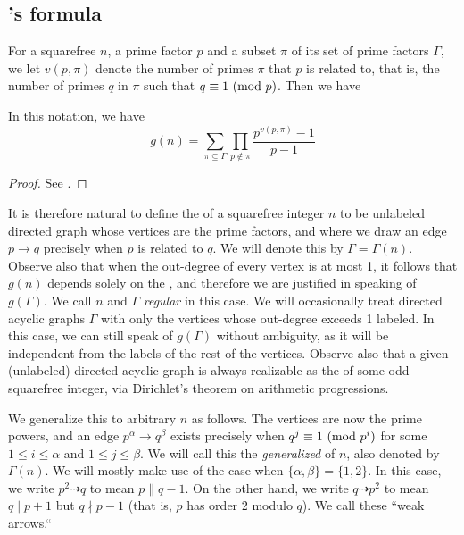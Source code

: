 \subsection{'s formula}
For a squarefree $n$, a prime factor $p$ and a subset $\pi$ of its set of prime factors $\Gamma$, we let $v(p, \pi)$ denote the number of primes $\pi$ that $p$ is related to, that is, the number of primes $q$ in $\pi$ such that $q \equiv 1 \ (\mathrm{mod} \ p)$. Then we have
\begin{fact} In this notation, we have
	\begin{equation*}
		g(n) = \sum_{\pi \subseteq \Gamma} \prod_{p \notin \pi} \frac{p^{v(p, \pi)} - 1}{p - 1}
	\end{equation*}
\end{fact}
\begin{proof} See {\cite[Theorem~5.1]{gnumoas}}. \end{proof}

It is therefore natural to define the \emph{} of a squarefree integer $n$ to be unlabeled directed graph whose vertices are the prime factors, and where we draw an edge $p \rightarrow q$ precisely when $p$ is related to $q$. We will denote this by $\Gamma = \Gamma(n)$. Observe also that when the out-degree of every vertex is at most 1, it follows that $g(n)$ depends solely on the , and therefore we are justified in speaking of $g(\Gamma).$ We call $n$ and $\Gamma$ \emph{regular} in this case. We will occasionally treat directed acyclic graphs $\Gamma$ with only the vertices whose out-degree exceeds 1 labeled. In this case, we can still speak of $g(\Gamma)$ without ambiguity, as it will be independent from the labels of the rest of the vertices. Observe also that a given (unlabeled) directed acyclic graph is always realizable as the  of some odd squarefree integer, via Dirichlet's theorem on arithmetic progressions.

We generalize this to arbitrary $n$ as follows. The vertices are now the prime powers, and an edge $p^\alpha \rightarrow q^\beta$ exists precisely when $q^j \equiv 1 \ (\mathrm{mod} \ p^i)$ for some $1 \le i \le \alpha$ and $1 \le j \le \beta$. We will call this the \emph{generalized \hg} of $n$, also denoted by $\Gamma(n)$. We will mostly make use of the case when $\{\alpha, \beta\} = \{1, 2\}$. In this case, we write $p^2 \dashrightarrow q$ to mean $p \parallel q - 1$. On the other hand, we write $q \dashrightarrow p^2$ to mean $q \mid p + 1$ but $q \nmid p - 1$ (that is, $p$ has order $2$ modulo $q$). We call these ``weak arrows.``

